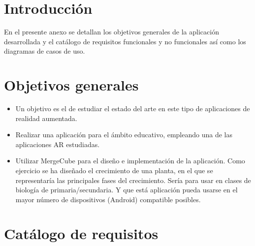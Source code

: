 
\section{Introducción}
En el presente anexo se detallan los objetivos generales de la aplicación desarrollada y el catálogo de requisitos funcionales y no funcionales así como los diagramas de casos de uso.
\section{Objetivos generales}
\begin{itemize}
	\item Un objetivo es el de estudiar el estado del arte en este tipo de aplicaciones de realidad aumentada. 
	\item Realizar una aplicación para el ámbito educativo, empleando una de las aplicaciones AR estudiadas.
	\item Utilizar MergeCube para el diseño e implementación de la aplicación. Como ejercicio se ha diseñado el crecimiento de una planta, en el que se representaría las principales fases del crecimiento. Sería para usar en clases de biología de primaria/secundaria. Y que está aplicación pueda usarse en el mayor número de dispositivos (Android) compatible posibles.
\end{itemize}
\section{Catálogo de requisitos}
